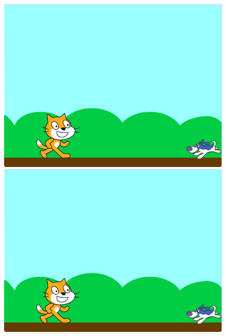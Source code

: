 \documentclass[10pt, a4paper]{article}
\begin{document}
\begin{enumerate}
\begin{figure}[htbp]
\begin{minipage}[t]{.24\textwidth}
            \end{minipage}
            \begin{minipage}[t]{.24\textwidth}
                \centering
                \includegraphics[width=\textwidth]{37-3.png}
            \end{minipage}
            \begin{minipage}[t]{.24\textwidth}
                \centering
                \includegraphics[width=\textwidth]{37-4.png}
            \end{minipage}
        \end{figure}
    \end{enumerate}
\end{document}
